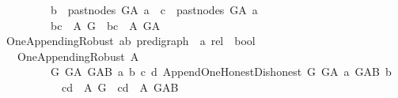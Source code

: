\begin{isabellebody}
\ \ \ \ \ \ \ \ {\isasymor}\ {\isacharparenleft}{\kern0pt}b\ {\isasymnotin}\ past{\isacharunderscore}{\kern0pt}nodes\ G{\isacharunderscore}{\kern0pt}A\ a\ {\isasymand}\ c\ {\isasymnotin}\ past{\isacharunderscore}{\kern0pt}nodes\ G{\isacharunderscore}{\kern0pt}A\ a{\isacharparenright}{\kern0pt}{\isacharparenright}{\kern0pt}{\isacharparenright}{\kern0pt}\isanewline
\ \ \ \ \ \ \ \ {\isasymlongrightarrow}\ {\isacharparenleft}{\kern0pt}{\isacharparenleft}{\kern0pt}b{\isacharcomma}{\kern0pt}c{\isacharparenright}{\kern0pt}\ {\isasymin}\ {\isacharparenleft}{\kern0pt}A\ G{\isacharparenright}{\kern0pt}\ {\isasymlongrightarrow}\ {\isacharparenleft}{\kern0pt}b{\isacharcomma}{\kern0pt}c{\isacharparenright}{\kern0pt}\ {\isasymin}\ {\isacharparenleft}{\kern0pt}A\ G{\isacharunderscore}{\kern0pt}A{\isacharparenright}{\kern0pt}{\isacharparenright}{\kern0pt}{\isacharparenright}{\kern0pt}{\isachardoublequoteclose}\isanewline
\isanewline
\isanewline
{}\isamarkupfalse%
\ One{\isacharunderscore}{\kern0pt}Appending{\isacharunderscore}{\kern0pt}Robust{\isacharcolon}{\kern0pt}{\isacharcolon}{\kern0pt}\ {\isachardoublequoteopen}{\isacharparenleft}{\kern0pt}{\isacharparenleft}{\kern0pt}{\isacharprime}{\kern0pt}a{\isacharcomma}{\kern0pt}{\isacharprime}{\kern0pt}b{\isacharparenright}{\kern0pt}\ pre{\isacharunderscore}{\kern0pt}digraph\ {\isasymRightarrow}\ {\isacharprime}{\kern0pt}a\ rel{\isacharparenright}{\kern0pt}\ {\isasymRightarrow}\ bool\ {\isachardoublequoteclose}\isanewline
\ \ \ {\isachardoublequoteopen}One{\isacharunderscore}{\kern0pt}Appending{\isacharunderscore}{\kern0pt}Robust\ A\ {\isasymequiv}\isanewline
\ \ \ \ \ \ \ \ \ {\isacharparenleft}{\kern0pt}{\isasymforall}G\ G{\isacharunderscore}{\kern0pt}A\ G{\isacharunderscore}{\kern0pt}AB\ a\ b\ c\ d{\isachardot}{\kern0pt}\ Append{\isacharunderscore}{\kern0pt}One{\isacharunderscore}{\kern0pt}Honest{\isacharunderscore}{\kern0pt}Dishonest\ G\ G{\isacharunderscore}{\kern0pt}A\ a\ G{\isacharunderscore}{\kern0pt}AB\ b\isanewline
\ \ \ \ \ \ \ \ \ \ {\isasymlongrightarrow}\ {\isacharparenleft}{\kern0pt}{\isacharparenleft}{\kern0pt}c{\isacharcomma}{\kern0pt}d{\isacharparenright}{\kern0pt}\ {\isasymin}\ {\isacharparenleft}{\kern0pt}A\ G{\isacharparenright}{\kern0pt}\ {\isasymlongrightarrow}\ {\isacharparenleft}{\kern0pt}c{\isacharcomma}{\kern0pt}d{\isacharparenright}{\kern0pt}\ {\isasymin}\ {\isacharparenleft}{\kern0pt}A\ G{\isacharunderscore}{\kern0pt}AB{\isacharparenright}{\kern0pt}{\isacharparenright}{\kern0pt}{\isacharparenright}{\kern0pt}{\isachardoublequoteclose}\isanewline
\isanewline
\isanewline
\isanewline
%
\isadelimtheory
\isanewline
%
\endisadelimtheory
%
\isatagtheory
{}\isamarkupfalse%
%
\endisatagtheory
{\isafoldtheory}%
%
\isadelimtheory
%
\endisadelimtheory
%
\end{isabellebody}%
\endinput
